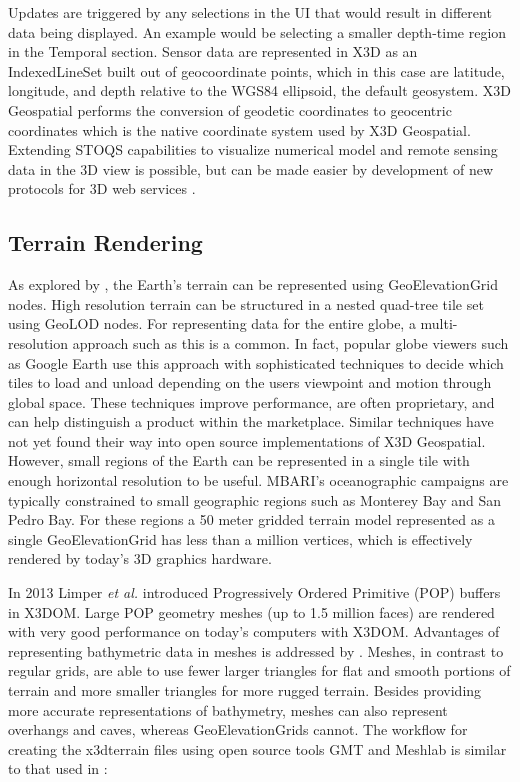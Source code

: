\documentclass[conference]{IEEEtran}
\begin{document}
Updates are triggered by any selections in the UI that would result in different data being displayed. An example would be selecting a smaller depth-time region in the Temporal section. Sensor data are represented in X3D as an IndexedLineSet built out of geocoordinate points, which in this case are latitude, longitude, and depth relative to the WGS84 ellipsoid, the default geosystem. X3D Geospatial performs the conversion of geodetic coordinates to geocentric coordinates which is the native coordinate system used by X3D Geospatial. Extending STOQS capabilities to visualize numerical model and remote sensing data in the 3D view is possible, but can be made easier by development of new protocols for 3D web services \cite{McCann:2014:IXG:2628588.2628609}.

\subsection{Terrain Rendering}

As explored by \cite{yoo09}, the Earth's terrain can be represented using GeoElevationGrid nodes. High resolution terrain can be structured in a nested quad-tree tile set using GeoLOD nodes. For representing data for the entire globe, a multi-resolution approach such as this is a common. In fact, popular globe viewers such as Google Earth use this approach with sophisticated techniques to decide which tiles to load and unload depending on the users viewpoint and motion through global space. These techniques improve performance, are often proprietary, and can help distinguish a product within the marketplace. Similar techniques have not yet found their way into open source implementations of X3D Geospatial. However, small regions of the Earth can be represented in a single tile with enough horizontal resolution to be useful. MBARI's oceanographic campaigns are typically constrained to small geographic regions such as Monterey Bay and San Pedro Bay. For these regions a 50 meter gridded terrain model represented as a single GeoElevationGrid has less than a million vertices, which is effectively  rendered by today's 3D graphics hardware.

In 2013 Limper \textit{et al.} \cite{Limper:2013:FDW:2466533.2466536} introduced Progressively Ordered Primitive (POP) buffers in X3DOM. Large POP geometry meshes (up to 1.5 million faces) are rendered with very good performance on today's computers with X3DOM. Advantages of representing bathymetric data in meshes is addressed by \cite{Becker:2005:NPN:1650409.1650513}. Meshes, in contrast to regular grids, are able to use fewer larger triangles for flat and smooth portions of terrain and more smaller triangles for more rugged terrain. Besides providing more accurate representations of bathymetry, meshes can also represent overhangs and caves, whereas GeoElevationGrids cannot. The workflow for creating the x3dterrain files using open source tools GMT \cite{GMT} and Meshlab \cite{Meshlab} is similar to that used in \cite{Silvestre}:
\end{document}
